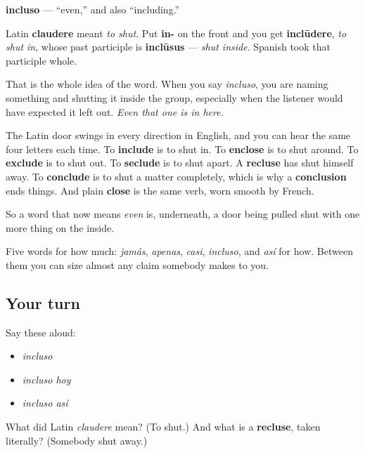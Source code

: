 \begin{cousinweb}
\textbf{incluso} — \textquotedblleft{}even,\textquotedblright{} and also \textquotedblleft{}including.\textquotedblright{}

Latin \textbf{claudere} meant \emph{to shut}. Put \textbf{in-} on the front and you get \textbf{inclūdere}, \emph{to shut in}, whose past participle is \textbf{inclūsus} — \emph{shut inside}. Spanish took that participle whole.

That is the whole idea of the word. When you say \emph{incluso}, you are naming something and shutting it inside the group, especially when the listener would have expected it left out. \emph{Even that one is in here.}

The Latin door swings in every direction in English, and you can hear the same four letters each time. To \textbf{include} is to shut in. To \textbf{enclose} is to shut around. To \textbf{exclude} is to shut out. To \textbf{seclude} is to shut apart. A \textbf{recluse} has shut himself away. To \textbf{conclude} is to shut a matter completely, which is why a \textbf{conclusion} ends things. And plain \textbf{close} is the same verb, worn smooth by French.

So a word that now means \emph{even} is, underneath, a door being pulled shut with one more thing on the inside.
\end{cousinweb}

\begin{grammarlens}[title={What you've built}]
Five words for how much: \emph{jamás}, \emph{apenas}, \emph{casi}, \emph{incluso}, and \emph{así} for how. Between them you can size almost any claim somebody makes to you.
\end{grammarlens}

\subsection*{Your turn}
Say these aloud:

\begin{itemize}
\raggedright
  \item \emph{incluso}
  \item \emph{incluso hoy}
  \item \emph{incluso así}
\end{itemize}

\begin{tcolorbox}[breakable,colback=teal!4,colframe=teal!35!black,title={Before you move on}]
What did Latin \emph{claudere} mean? (To shut.) And what is a \textbf{recluse}, taken literally? (Somebody shut away.)
\end{tcolorbox}
